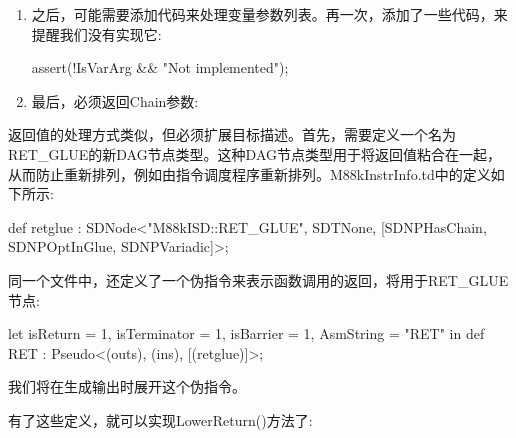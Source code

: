 \begin{enumerate}
\begin{cpp}
        } else {
            llvm_unreachable("Not implemented");
        }
    }
\end{cpp}

\item
之后，可能需要添加代码来处理变量参数列表。再一次，添加了一些代码，来提醒我们没有实现它:

\begin{cpp}
    assert(!IsVarArg && "Not implemented");
\end{cpp}

\item
最后，必须返回Chain参数:

\begin{cpp}
    return Chain;
}
\end{cpp}
\end{enumerate}


返回值的处理方式类似，但必须扩展目标描述。首先，需要定义一个名为RET\_GLUE的新DAG节点类型。这种DAG节点类型用于将返回值粘合在一起，从而防止重新排列，例如由指令调度程序重新排列。M88kInstrInfo.td中的定义如下所示:

\begin{cpp}
def retglue : SDNode<"M88kISD::RET_GLUE", SDTNone,
                [SDNPHasChain, SDNPOptInGlue, SDNPVariadic]>;
\end{cpp}

同一个文件中，还定义了一个伪指令来表示函数调用的返回，将用于RET\_GLUE节点:

\begin{cpp}
let isReturn = 1, isTerminator = 1, isBarrier = 1,
        AsmString = "RET" in
    def RET : Pseudo<(outs), (ins), [(retglue)]>;
\end{cpp}

我们将在生成输出时展开这个伪指令。

有了这些定义，就可以实现LowerReturn()方法了:


